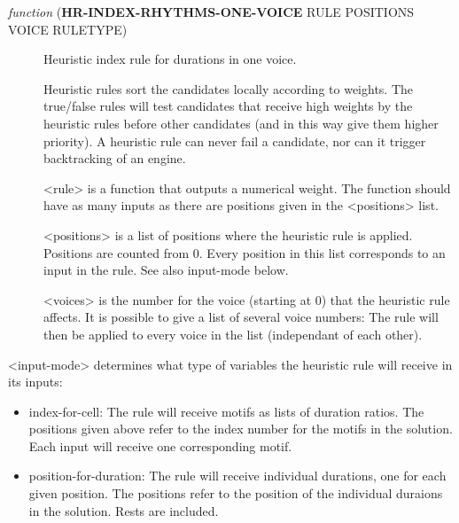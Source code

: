 \begin{description}
\item[{ \emph{function} (\textbf{HR-INDEX-RHYTHMS-ONE-VOICE} RULE POSITIONS VOICE RULETYPE)}] Heuristic index rule for durations in one voice.

Heuristic rules sort the candidates locally according to weights. 
The true/false rules will test candidates that receive high weights by
the heuristic rules before other candidates (and in this way give them
higher priority). A heuristic rule can never fail a candidate, nor 
can it trigger backtracking of an engine. 

<rule> is a function that outputs a numerical weight. The function 
should have as many inputs as there are positions given in the 
<positions> list. 

<positions> is a list of positions where the heuristic rule is applied.
Positions are counted from 0. Every position in this list corresponds to
an input in the rule. See also input-mode below.

<voices> is the number for the voice (starting at 0) that the heuristic 
rule affects. It is possible to give a list of several voice numbers: 
The rule will then be applied to every voice in the list (independant 
of each other).
\end{description}


<input-mode> determines what type of variables the heuristic rule will
receive in its inputs:
\begin{itemize}
\item index-for-cell: The rule will receive motifs as lists of duration 
ratios. The positions given above refer to the index
number for the motifs in the solution. Each input 
will receive one corresponding motif.
\item position-for-duration: The rule will receive individual
durations, one for each given position.
The positions refer to the position
of the individual duraions in the solution.
Rests are included.
\end{itemize}



